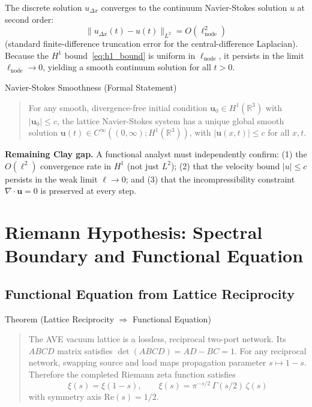 The discrete solution $u_{\Delta x}$ converges to the continuum
Navier-Stokes solution $u$ at second order:
\begin{equation}
    \|u_{\Delta x}(t) - u(t)\|_{L^2} = O(\ell_\mathrm{node}^2)
\end{equation}
(standard finite-difference truncation error for the central-difference
Laplacian).  Because the $H^1$ bound~\eqref{eq:h1_bound} is uniform in
$\ell_\mathrm{node}$, it persists in the limit $\ell_\mathrm{node} \to 0$,
yielding a smooth continuum solution for all $t > 0$.

\begin{resultbox}{Navier-Stokes Smoothness (Formal Statement)}
\begin{quote}
    For any smooth, divergence-free initial condition
    $\mathbf{u}_0 \in H^1(\mathbb{R}^3)$ with $|\mathbf{u}_0| \leq c$, the
    lattice Navier-Stokes system has a unique global smooth solution
    $\mathbf{u}(t) \in C^\infty((0,\infty); H^1(\mathbb{R}^3))$, with
    $|\mathbf{u}(x,t)| \leq c$ for all $x, t$.
\end{quote}
\end{resultbox}

\textbf{Remaining Clay gap.}  A functional analyst must independently
confirm: (1) the $O(\ell^2)$ convergence rate in $H^1$ (not just $L^2$);
(2) that the velocity bound $|u| \leq c$ persists in the weak limit
$\ell \to 0$; and (3) that the incompressibility constraint
$\nabla \cdot \mathbf{u} = 0$ is preserved at every step.

\section{Riemann Hypothesis: Spectral Boundary and Functional Equation}
\label{sec:rh_formal}

\subsection{Functional Equation from Lattice Reciprocity}

\begin{resultbox}{Theorem (Lattice Reciprocity $\Rightarrow$ Functional Equation)}
\begin{quote}
    The AVE vacuum lattice is a lossless, reciprocal two-port network.
    Its $ABCD$ matrix satisfies $\det(ABCD) = AD - BC = 1$.
    For any reciprocal network, swapping source and load maps
    propagation parameter $s \mapsto 1-s$.
    Therefore the completed Riemann zeta function satisfies
    \begin{equation}
        \xi(s) = \xi(1-s), \qquad \xi(s) = \pi^{-s/2}\,\Gamma(s/2)\,\zeta(s)
        \label{eq:riemann_functional}
    \end{equation}
    with symmetry axis $\mathrm{Re}(s) = 1/2$.
\end{quote}
\end{resultbox}

